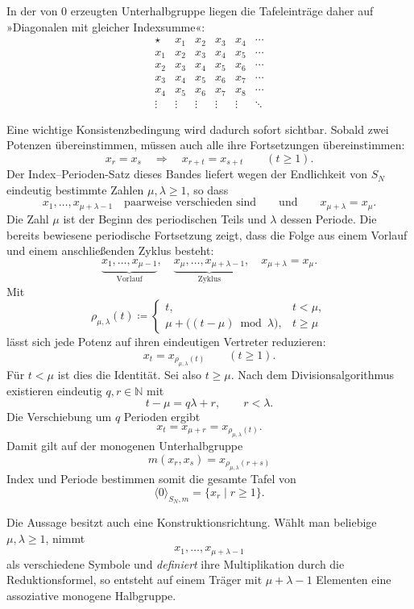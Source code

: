 \documentclass[main.tex]{subfiles}
\begin{document}
In der von \(0\) erzeugten Unterhalbgruppe liegen die Tafeleinträge daher
auf »Diagonalen mit gleicher Indexsumme«:
\[
\begin{array}{c|ccccc}
\star &x_1&x_2&x_3&x_4&\cdots\\\hline
x_1&x_2&x_3&x_4&x_5&\cdots\\
x_2&x_3&x_4&x_5&x_6&\cdots\\
x_3&x_4&x_5&x_6&x_7&\cdots\\
x_4&x_5&x_6&x_7&x_8&\cdots\\
\vdots&\vdots&\vdots&\vdots&\vdots&\ddots
\end{array}
\]

Eine wichtige Konsistenzbedingung wird dadurch sofort sichtbar.  Sobald
zwei Potenzen übereinstimmen, müssen auch alle ihre Fortsetzungen
übereinstimmen:
\[
  x_r=x_s
  \quad\Longrightarrow\quad
  x_{r+t}=x_{s+t}
  \qquad(t\geq1).
\]
Der Index--Perioden-Satz dieses Bandes liefert wegen der Endlichkeit von
\(S_N\) eindeutig bestimmte Zahlen \(\mu,\lambda\geq1\), so dass
\[
  x_1,\ldots,x_{\mu+\lambda-1}
  \quad\text{paarweise verschieden sind}
  \qquad\text{und}\qquad
  x_{\mu+\lambda}=x_\mu.
\]
Die Zahl \(\mu\) ist der Beginn des periodischen Teils und \(\lambda\) dessen
Periode.  Die bereits bewiesene periodische Fortsetzung zeigt, dass die Folge
aus einem Vorlauf und einem anschließenden Zyklus besteht:
\[
  \underbrace{x_1,\ldots,x_{\mu-1}}_{\text{Vorlauf}},
  \quad
  \underbrace{x_\mu,\ldots,x_{\mu+\lambda-1}}_{\text{Zyklus}},
  \quad
  x_{\mu+\lambda}=x_\mu.
\]
Mit
\[
  \rho_{\mu,\lambda}(t)
  \coloneqq
  \begin{cases}
    t,&t<\mu,\\
    \mu+\bigl((t-\mu)\bmod\lambda\bigr),&t\geq\mu
  \end{cases}
\]
lässt sich jede Potenz auf ihren eindeutigen Vertreter reduzieren:
\[
  \boxed{x_t=x_{\rho_{\mu,\lambda}(t)}}\qquad(t\geq1).
\]
Für \(t<\mu\) ist dies die Identität.  Sei also \(t\geq\mu\).  Nach dem
Divisionsalgorithmus existieren eindeutig \(q,r\in\mathbb N\) mit
\[
  t-\mu=q\lambda+r,\qquad r<\lambda.
\]
Die Verschiebung um \(q\) Perioden ergibt
\[
  x_t=x_{\mu+r}
     =x_{\rho_{\mu,\lambda}(t)}.
\]
Damit gilt auf der monogenen Unterhalbgruppe
\[
  \boxed{
    m(x_r,x_s)=x_{\rho_{\mu,\lambda}(r+s)}
  }
\]
Index und Periode bestimmen somit die gesamte Tafel von
\[
  \langle0\rangle_{S_N,m}=\{x_r\mid r\geq1\}.
\]

Die Aussage besitzt auch eine Konstruktionsrichtung.  Wählt man beliebige
\(\mu,\lambda\geq1\), nimmt
\[
  x_1,\ldots,x_{\mu+\lambda-1}
\]
als verschiedene Symbole und \emph{definiert} ihre Multiplikation durch die
Reduktionsformel, so entsteht auf einem Träger mit
\(\mu+\lambda-1\) Elementen eine assoziative monogene Halbgruppe.
\end{document}
